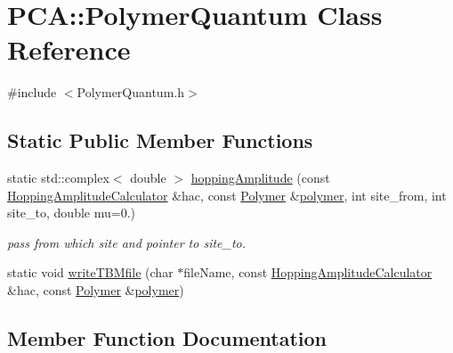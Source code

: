\hypertarget{class_p_c_a_1_1_polymer_quantum}{}\section{P\+CA\+:\+:Polymer\+Quantum Class Reference}
\label{class_p_c_a_1_1_polymer_quantum}


{\ttfamily \#include $<$Polymer\+Quantum.\+h$>$}

\subsection*{Static Public Member Functions}
\begin{DoxyCompactItemize}
\item 
static std\+::complex$<$ double $>$ \hyperlink{class_p_c_a_1_1_polymer_quantum_a2f07ef3198c2a5ca75494df5364c1a89}{hopping\+Amplitude} (const \hyperlink{class_p_c_a_1_1_hopping_amplitude_calculator}{Hopping\+Amplitude\+Calculator} \&hac, const \hyperlink{class_p_c_a_1_1_polymer}{Polymer} \&\hyperlink{classpolymer}{polymer}, int site\+\_\+from, int site\+\_\+to, double mu=0.)
\begin{DoxyCompactList}\small\item\em pass from which site and pointer to site\+\_\+to. \end{DoxyCompactList}\item 
static void \hyperlink{class_p_c_a_1_1_polymer_quantum_ac035f7bd1e3f5779d82048af7794e05d}{write\+T\+B\+Mfile} (char $\ast$file\+Name, const \hyperlink{class_p_c_a_1_1_hopping_amplitude_calculator}{Hopping\+Amplitude\+Calculator} \&hac, const \hyperlink{class_p_c_a_1_1_polymer}{Polymer} \&\hyperlink{classpolymer}{polymer})
\end{DoxyCompactItemize}


\subsection{Member Function Documentation}
\hypertarget{class_p_c_a_1_1_polymer_quantum_a2f07ef3198c2a5ca75494df5364c1a89}{}\label{class_p_c_a_1_1_polymer_quantum_a2f07ef3198c2a5ca75494df5364c1a89} 
